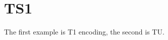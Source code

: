 \documentclass{article}
\begin{document}
\section*{TS1}

The first example is T1 encoding, the second is TU.

\begin{multicols}{3}


\TEST{\textcapitalcompwordmark}
\TEST{\textascendercompwordmark}
\TEST{\textquotestraightbase}
\TEST{\textquotestraightdblbase}
\TEST{\texttwelveudash}
\TEST{\textthreequartersemdash}
\TEST{\textleftarrow}
\TEST{\textrightarrow}
\TEST{\textblank}
\TEST{\textdollar}
\TEST{\textquotesingle}
\TEST{\textasteriskcentered}
\TEST{\textdblhyphen}
\TEST{\textfractionsolidus}
\TEST{\textzerooldstyle}
\TEST{\textoneoldstyle}
\TEST{\texttwooldstyle}
\TEST{\textthreeoldstyle}
\TEST{\textfouroldstyle}
\TEST{\textfiveoldstyle}
\TEST{\textsixoldstyle}
\TEST{\textsevenoldstyle}
\TEST{\texteightoldstyle}
\TEST{\textnineoldstyle}
\TEST{\textlangle}
\TEST{\textminus}
\TEST{\textrangle}
\TEST{\textmho}
\TEST{\textbigcircle}
\TEST{\textohm}
\TEST{\textlbrackdbl}
\TEST{\textrbrackdbl}
\TEST{\textuparrow}
\TEST{\textdownarrow}
\TEST{\textasciigrave}
\TEST{\textborn}
\TEST{\textdivorced}
\TEST{\textdied}
\TEST{\textleaf}
\TEST{\textmarried}
\TEST{\textmusicalnote}
\TEST{\texttildelow}
\TEST{\textdblhyphenchar}
\TEST{\textasciibreve}
\TEST{\textasciicaron}
\TEST{\textacutedbl}
\TEST{\textgravedbl}
\TEST{\textdagger}
\TEST{\textdaggerdbl}
\TEST{\textbardbl}
\TEST{\textperthousand}
\TEST{\textbullet}
\TEST{\textcelsius}
\TEST{\textdollaroldstyle}
\TEST{\textcentoldstyle}
\TEST{\textflorin}
\TEST{\textcolonmonetary}
\TEST{\textwon}
\TEST{\textnaira}
\TEST{\textguarani}
\TEST{\textpeso}
\TEST{\textlira}
\TEST{\textrecipe}
\TEST{\textinterrobang}
\TEST{\textinterrobangdown}
\TEST{\textdong}
\TEST{\texttrademark}
\TEST{\textpertenthousand}
\TEST{\textpilcrow}
\TEST{\textbaht}
\TEST{\textnumero}
\TEST{\textdiscount}
\TEST{\textestimated}
\TEST{\textopenbullet}
\TEST{\textservicemark}
\TEST{\textlquill}
\TEST{\textrquill}
\TEST{\textcent}
\TEST{\textsterling}
\TEST{\textcurrency}
\TEST{\textyen}
\TEST{\textbrokenbar}
\TEST{\textsection}
\TEST{\textasciidieresis}
\TEST{\textcopyright}
\TEST{\textordfeminine}
\TEST{\textcopyleft}
\TEST{\textlnot}
\TEST{\textcircledP}
\TEST{\textregistered}
\TEST{\textasciimacron}
\TEST{\textdegree}
\TEST{\textpm}
\TEST{\texttwosuperior}
\TEST{\textthreesuperior}
\TEST{\textasciiacute}
\TEST{\textmu}
\TEST{\textparagraph}
\TEST{\textperiodcentered}
\TEST{\textreferencemark}
\TEST{\textonesuperior}
\TEST{\textordmasculine}
\TEST{\textsurd}
\TEST{\textonequarter}
\TEST{\textonehalf}
\TEST{\textthreequarters}
\TEST{\texteuro}
\TEST{\texttimes}
\TEST{\textdiv}

\end{multicols}
\end{document}
